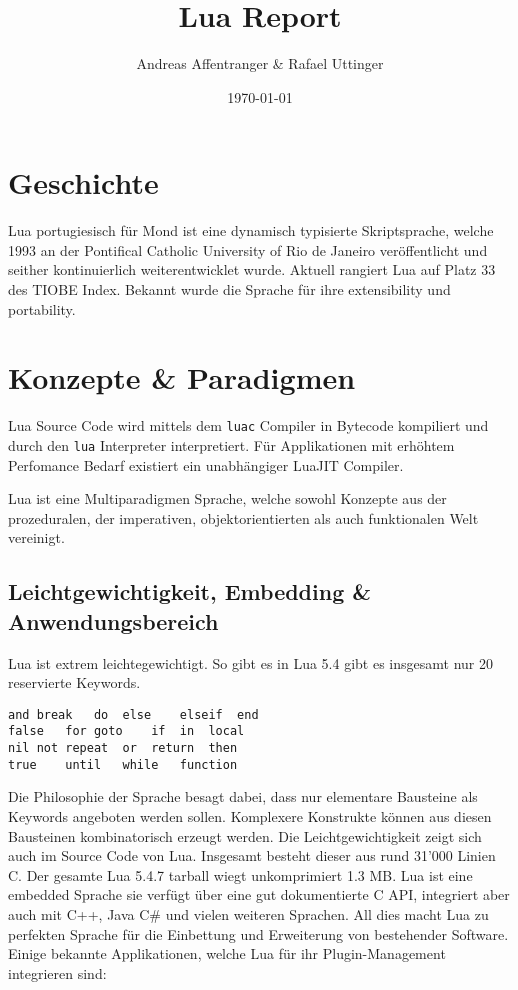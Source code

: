 \documentclass[11pt,a4paper]{article}
\title{Lua Report}
\author{Andreas Affentranger \& Rafael Uttinger}
\date{\today}
\begin{document}
\maketitle

\section*{Geschichte}

Lua portugiesisch für Mond ist eine dynamisch typisierte Skriptsprache, welche 1993 an der Pontifical Catholic University of Rio de Janeiro veröffentlicht und seither kontinuierlich weiterentwicklet wurde. Aktuell rangiert Lua auf Platz 33 des TIOBE Index. Bekannt wurde die Sprache für ihre extensibility und portability.

\section*{Konzepte \& Paradigmen}

Lua Source Code wird mittels dem \texttt{luac} Compiler in Bytecode kompiliert und durch den \texttt{lua} Interpreter interpretiert. Für Applikationen mit erhöhtem Perfomance Bedarf existiert ein unabhängiger LuaJIT Compiler.

Lua ist eine Multiparadigmen Sprache, welche sowohl Konzepte aus der prozeduralen, der imperativen, objektorientierten als auch funktionalen Welt vereinigt.

\subsection*{Leichtgewichtigkeit, Embedding \& Anwendungsbereich}

Lua ist extrem leichtegewichtigt. So gibt es in Lua 5.4 gibt es insgesamt nur 20 reservierte Keywords.

\begin{lstlisting}
and	break	do	else	elseif	end
false	for	goto 	if	in	local
nil	not	repeat	or	return	then
true	until	while	function
\end{lstlisting}

Die Philosophie der Sprache besagt dabei, dass nur elementare Bausteine als Keywords angeboten werden sollen. Komplexere Konstrukte können aus diesen Bausteinen kombinatorisch erzeugt werden. Die Leichtgewichtigkeit zeigt sich auch im Source Code von Lua. Insgesamt besteht dieser aus rund 31’000 Linien C. Der gesamte Lua 5.4.7 tarball wiegt unkomprimiert 1.3 MB.
Lua ist eine embedded Sprache sie verfügt über eine gut dokumentierte C API, integriert aber auch mit C++, Java C\# und vielen weiteren Sprachen. All dies macht Lua zu perfekten Sprache für die Einbettung und Erweiterung von bestehender Software.
Einige bekannte Applikationen, welche Lua für ihr Plugin-Management integrieren sind:
\end{document}
